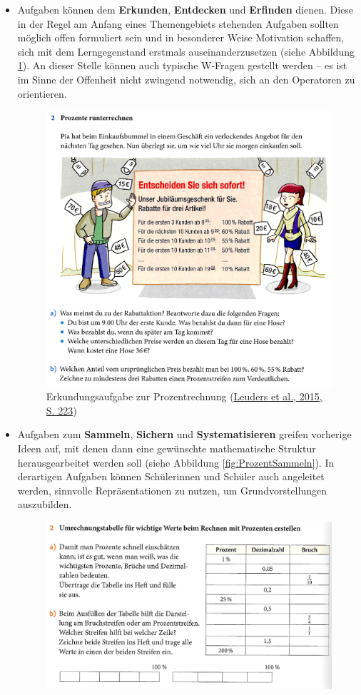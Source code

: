 \documentclass[
]{scrbook}
\theoremstyle{definition}
\theoremstyle{definition}
\theoremstyle{definition}
\theoremstyle{definition}
\theoremstyle{remark}
\begin{document}
\begin{itemize}
\item
  Aufgaben können dem \textbf{Erkunden}, \textbf{Entdecken} und \textbf{Erfinden} dienen. Diese in der Regel am Anfang eines Themengebiets stehenden Aufgaben sollten möglich offen formuliert sein und in besonderer Weise Motivation schaffen, sich mit dem Lerngegenstand erstmals auseinanderzusetzen (siehe Abbildung \ref{fig:ProzentErkunden}). An dieser Stelle können auch typische W-Fragen gestellt werden -- es ist im Sinne der Offenheit nicht zwingend notwendig, sich an den Operatoren zu orientieren.

  \begin{figure}

    {\centering \includegraphics[width=0.75\linewidth]{pictures/8-ProzentErkunden} 

    }

    \caption{Erkundungsaufgabe zur Prozentrechnung (\protect\hyperlink{ref-Barzel2015a}{Leuders et al., 2015, S. 223})}\label{fig:ProzentErkunden}
    \end{figure}
\item
  Aufgaben zum \textbf{Sammeln}, \textbf{Sichern} und \textbf{Systematisieren} greifen vorherige Ideen auf, mit denen dann eine gewünschte mathematische Struktur herausgearbeitet werden soll (siehe Abbildung \ref{fig:ProzentSammeln}). In derartigen Aufgaben können Schülerinnen und Schüler auch angeleitet werden, sinnvolle Repräsentationen zu nutzen, um Grundvorstellungen auszubilden.

  \begin{figure}

    {\centering \includegraphics[width=0.75\linewidth]{pictures/8-ProzentSammeln} 

}
\end{figure}
\end{itemize}
\end{document}
